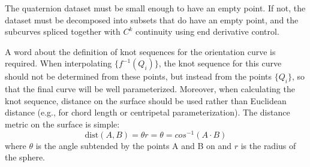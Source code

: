 \documentclass[12pt]{article}
\begin{document}
The quaternion dataset must be small enough to have an empty point.
If not, the dataset must be decomposed into subsets that do have an empty point,
and the subcurves spliced together with $C^k$ continuity using end derivative control.

A word about the definition of knot sequences for the orientation curve is required.
When interpolating $\{f^{-1}(Q_i)\}$,
the knot sequence for this curve should not be determined from these points,
but instead from the points $\{Q_i\}$, so that the final curve will be well parameterized.
Moreover, when calculating the knot sequence, distance on the surface 
should be used rather than Euclidean distance (e.g., for chord length or centripetal
parameterization).
The distance metric on the surface is simple:
\[
\mbox{dist}(A,B) = \theta r = \theta = cos^{-1}(A \cdot B)
\]
where $\theta$ is the angle subtended by the points A and B on 
and $r$ is the radius of the sphere.


\end{document}
